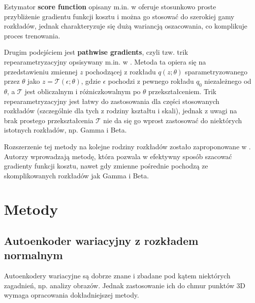 \documentclass{iithesis}
\begin{document}
Estymator \textbf{score function} opisany m.in. w \cite{score_fn} oferuje stosunkowo
proste przybliżenie gradientu funkcji kosztu i można go stosować do szerokiej gamy rozkładów,
jednak charakteryzuje się dużą wariancją oszacowania, co komplikuje proces trenowania.

Drugim podejściem jest \textbf{pathwise gradients}, czyli tzw. trik repearametryzacyjny
opsisywany m.in. w \cite{vae}. Metoda ta opiera się na przedstawieniu zmiennej $z$ pochodzącej
z rozkładu $q(z;\theta)$ sparametryzowanego przez $\theta$ jako $z=\mathcal{T}(\epsilon;\theta)$,
gdzie $\epsilon$ pochodzi z pewnego rokładu $q_0$ niezależnego od $\theta$, a
$\mathcal{T}$ jest obliczalnym i różniczkowalnym po $\theta$ przekształceniem.
Trik repearametryzacyjny jest łatwy do zastosowania dla części stosowanych rozkładów
(szczególnie dla tych z rodziny kształtu i skali), jednak z uwagi na brak prostego przekształcenia
$\mathcal{T}$ nie da się go wprost zastosować do niektórych istotnych rozkładów, np. Gamma i Beta.

Rozszerzenie tej metody na kolejne rodziny rozkładów zostało zaproponowane w \cite{pathwise_gradients}.
Autorzy wprowadzają metodę, która pozwala w efektywny sposób szacować gradienty funkcji kosztu,
nawet gdy zmienne pośrednie pochodzą ze skomplikowanych rozkładów jak Gamma i Beta.


\chapter{Metody}
\section{Autoenkoder wariacyjny z rozkładem normalnym}
\label{sec:vae_normal}
Autoenkodery wariacyjne są dobrze znane i zbadane pod kątem niektórych zagadnień,
np. analizy obrazów. Jednak zastosowanie ich do chmur punktów 3D wymaga opracowania
dokładniejszej metody.
\end{document}

